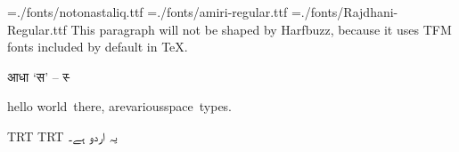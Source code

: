 \nopagenumbers
\parindent=0mm
\font\noto={./fonts/notonastaliq.ttf}
\font\amiri={./fonts/amiri-regular.ttf}
\font\raj={./fonts/Rajdhani-Regular.ttf}
This paragraph will not be shaped by Harfbuzz, because it uses TFM fonts included by default in \TeX.

\raj
आधा ‘स’ – स्‍

\amiri
hello world~there, are\quad various\qquad space\ types.

\textdir TRT
\pardir TRT
\noto
یہ اردو ہے۔
\bye
